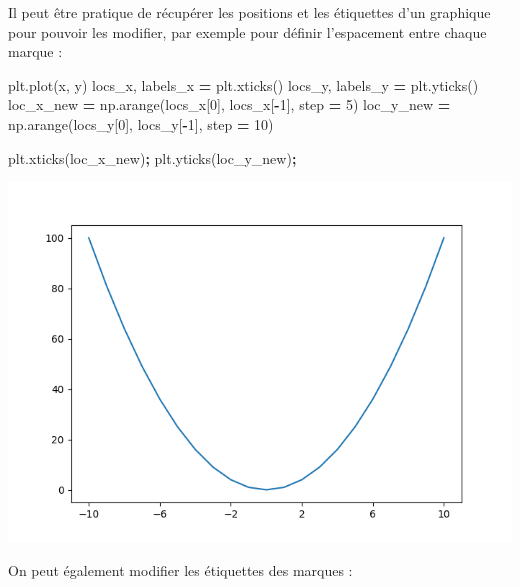 \documentclass[
  12pt,
]{book}
\newenvironment{Shaded}{\begin{snugshade}}{\end{snugshade}}
\newcommand{\DecValTok}[1]{\textcolor[rgb]{0.00,0.00,0.81}{#1}}
\newcommand{\NormalTok}[1]{#1}
\newcommand{\OperatorTok}[1]{\textcolor[rgb]{0.81,0.36,0.00}{\textbf{#1}}}
\numberwithin{equation}{section}
\numberwithin{countremarque}{section}
\begin{document}
Il peut être pratique de récupérer les positions et les étiquettes d'un graphique pour pouvoir les modifier, par exemple pour définir l'espacement entre chaque marque :

\begin{Shaded}
\begin{Highlighting}[]
\NormalTok{plt.plot(x, y)}
\NormalTok{locs\_x, labels\_x }\OperatorTok{=}\NormalTok{ plt.xticks()}
\NormalTok{locs\_y, labels\_y }\OperatorTok{=}\NormalTok{ plt.yticks()}
\NormalTok{loc\_x\_new }\OperatorTok{=}\NormalTok{ np.arange(locs\_x[}\DecValTok{0}\NormalTok{], locs\_x[}\OperatorTok{{-}}\DecValTok{1}\NormalTok{], step }\OperatorTok{=} \DecValTok{5}\NormalTok{)}
\NormalTok{loc\_y\_new }\OperatorTok{=}\NormalTok{ np.arange(locs\_y[}\DecValTok{0}\NormalTok{], locs\_y[}\OperatorTok{{-}}\DecValTok{1}\NormalTok{], step }\OperatorTok{=} \DecValTok{10}\NormalTok{)}

\NormalTok{plt.xticks(loc\_x\_new)}\OperatorTok{;}
\NormalTok{plt.yticks(loc\_y\_new)}\OperatorTok{;}
\end{Highlighting}
\end{Shaded}

\begin{center}\includegraphics[width=9.03in]{figs/pyplot/plot_ticks_2} \end{center}

On peut également modifier les étiquettes des marques :
\end{document}
